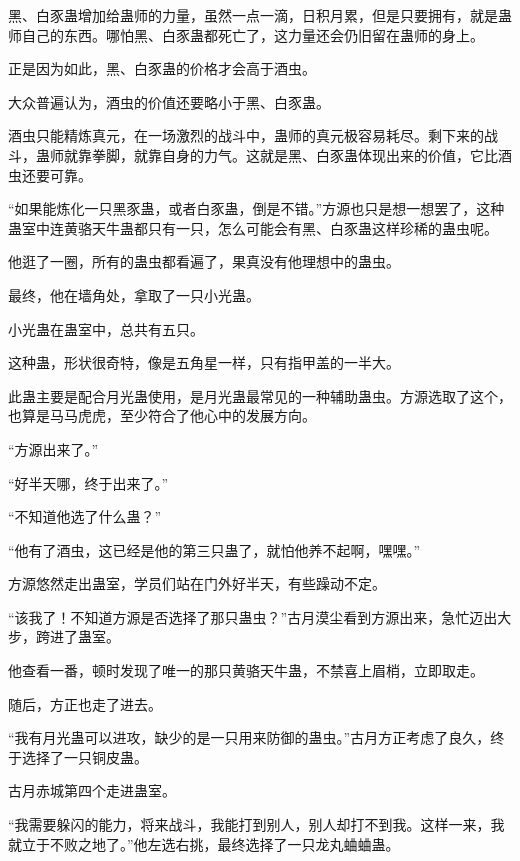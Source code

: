 \begin{this_body}
黑、白豕蛊增加给蛊师的力量，虽然一点一滴，日积月累，但是只要拥有，就是蛊师自己的东西。哪怕黑、白豕蛊都死亡了，这力量还会仍旧留在蛊师的身上。

正是因为如此，黑、白豕蛊的价格才会高于酒虫。

大众普遍认为，酒虫的价值还要略小于黑、白豕蛊。

酒虫只能精炼真元，在一场激烈的战斗中，蛊师的真元极容易耗尽。剩下来的战斗，蛊师就靠拳脚，就靠自身的力气。这就是黑、白豕蛊体现出来的价值，它比酒虫还要可靠。

“如果能炼化一只黑豕蛊，或者白豕蛊，倒是不错。”方源也只是想一想罢了，这种蛊室中连黄骆天牛蛊都只有一只，怎么可能会有黑、白豕蛊这样珍稀的蛊虫呢。

他逛了一圈，所有的蛊虫都看遍了，果真没有他理想中的蛊虫。

最终，他在墙角处，拿取了一只小光蛊。

小光蛊在蛊室中，总共有五只。

这种蛊，形状很奇特，像是五角星一样，只有指甲盖的一半大。

此蛊主要是配合月光蛊使用，是月光蛊最常见的一种辅助蛊虫。方源选取了这个，也算是马马虎虎，至少符合了他心中的发展方向。

“方源出来了。”

“好半天哪，终于出来了。”

“不知道他选了什么蛊？”

“他有了酒虫，这已经是他的第三只蛊了，就怕他养不起啊，嘿嘿。”

方源悠然走出蛊室，学员们站在门外好半天，有些躁动不定。

“该我了！不知道方源是否选择了那只蛊虫？”古月漠尘看到方源出来，急忙迈出大步，跨进了蛊室。

他查看一番，顿时发现了唯一的那只黄骆天牛蛊，不禁喜上眉梢，立即取走。

随后，方正也走了进去。

“我有月光蛊可以进攻，缺少的是一只用来防御的蛊虫。”古月方正考虑了良久，终于选择了一只铜皮蛊。

古月赤城第四个走进蛊室。

“我需要躲闪的能力，将来战斗，我能打到别人，别人却打不到我。这样一来，我就立于不败之地了。”他左选右挑，最终选择了一只龙丸蛐蛐蛊。

\end{this_body}

